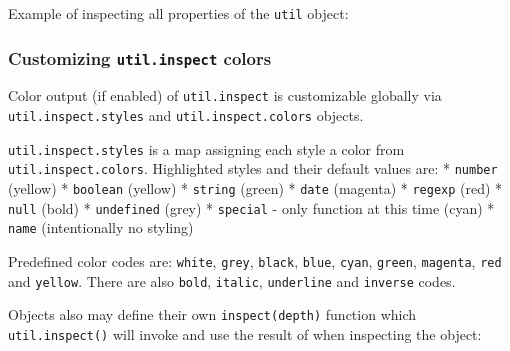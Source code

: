 Example of inspecting all properties of the \texttt{util} object:

\begin{Shaded}
\begin{Highlighting}[]
 \NormalTok{);}

\NormalTok{(}\NormalTok{: }\NormalTok{, }
\end{Highlighting}
\end{Shaded}

\subsubsection{Customizing \texttt{util.inspect} colors}

Color output (if enabled) of \texttt{util.inspect} is customizable
globally via \texttt{util.inspect.styles} and
\texttt{util.inspect.colors} objects.

\texttt{util.inspect.styles} is a map assigning each style a color from
\texttt{util.inspect.colors}. Highlighted styles and their default
values are: * \texttt{number} (yellow) * \texttt{boolean} (yellow) *
\texttt{string} (green) * \texttt{date} (magenta) * \texttt{regexp}
(red) * \texttt{null} (bold) * \texttt{undefined} (grey) *
\texttt{special} - only function at this time (cyan) * \texttt{name}
(intentionally no styling)

Predefined color codes are: \texttt{white}, \texttt{grey},
\texttt{black}, \texttt{blue}, \texttt{cyan}, \texttt{green},
\texttt{magenta}, \texttt{red} and \texttt{yellow}. There are also
\texttt{bold}, \texttt{italic}, \texttt{underline} and \texttt{inverse}
codes.

Objects also may define their own \texttt{inspect(depth)} function which
\texttt{util.inspect()} will invoke and use the result of when
inspecting the object:

\begin{Shaded}
\begin{Highlighting}[]
 \NormalTok{);}

 \NormalTok{: } \NormalTok{\};}
 \NormalTok{= }
    \NormalTok{+ } \NormalTok{+ }\NormalTok{;}
\NormalTok{\};}

\end{Highlighting}
\end{Shaded}

